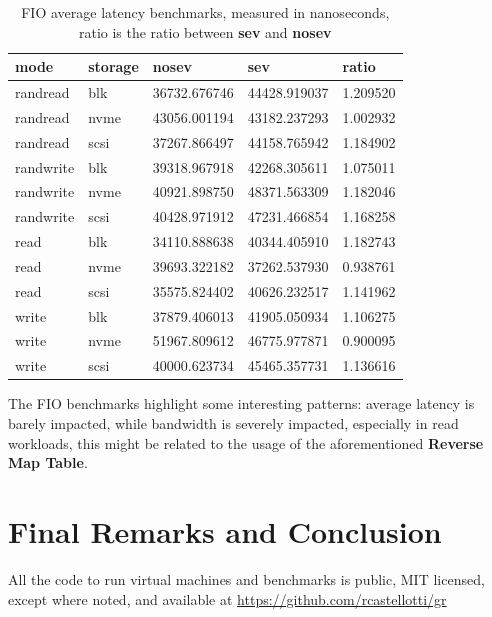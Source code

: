 \documentclass[twocolumn]{article}
\begin{document}
\begin{table}
    \small
    \begin{tabular}{lllll}
        \hline
        \textbf{mode}& \textbf{storage} & \textbf{nosev} & \textbf{sev} & \textbf{ratio} \\
        \hline
        randread & blk & 36732.676746 & 44428.919037 & 1.209520 \\
        randread & nvme & 43056.001194 & 43182.237293 & 1.002932 \\
        randread & scsi & 37267.866497 & 44158.765942 & 1.184902 \\
        randwrite & blk & 39318.967918 & 42268.305611 & 1.075011 \\
        randwrite & nvme & 40921.898750 & 48371.563309 & 1.182046 \\
        randwrite & scsi & 40428.971912 & 47231.466854 & 1.168258 \\
        read & blk & 34110.888638 & 40344.405910 & 1.182743 \\
        read & nvme & 39693.322182 & 37262.537930 & 0.938761 \\
        read & scsi & 35575.824402 & 40626.232517 & 1.141962 \\
        write & blk & 37879.406013 & 41905.050934 & 1.106275 \\
        write & nvme & 51967.809612 & 46775.977871 & 0.900095 \\
        write & scsi & 40000.623734 & 45465.357731 & 1.136616 \\
        \hline
    \end{tabular}
    \caption{FIO average latency benchmarks, measured in nanoseconds, ratio is the ratio between \textbf{sev} and \textbf{nosev}}
    \label{tab:al}
\end{table}

The FIO benchmarks highlight some interesting patterns: average latency is barely impacted, while bandwidth is severely impacted, especially in read workloads, this might be related to the usage of the aforementioned \textbf{Reverse Map Table}.

\section{Final Remarks and Conclusion}
All the code to run virtual machines and benchmarks is public, MIT licensed, except where noted, and available at \href{https://github.com/rcastellotti/gr}{https://github.com/rcastellotti/gr}
\end{document}
